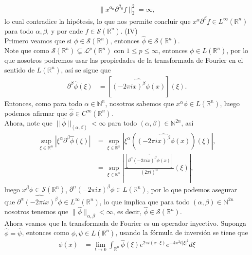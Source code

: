\begin{homeworkProblem}
\begin{solution}
    \begin{align*}
      \|x^{\alpha_0} \partial^{\beta_0} f\|_2^2 = \infty,
    \end{align*}
    lo cual contradice la hipótesis, lo que nos permite concluir que $x^\alpha \partial^\beta f \in L^\infty(\mathbb{R}^n)$ para todo $\alpha, \beta$, y por ende $f \in \mathcal{S}(\mathbb{R}^n)$.
    (IV)\\
    Primero veamos que si $\phi\in\mathcal{S}(\mathbb{R}^n)$, entonces $\hat{\phi}\in\mathcal{S}(\mathbb{R}^n)$.\\
	    Note que como $\mathcal{S}(\mathbb{R}^n)\subsetneq \mathcal{L}^p(\mathbb{R}^n)$ con $1\leq p \leq \infty$, entonces $\phi\in L(\mathbb{R}^n)$, por lo que nosotros podremos usar las propiedades de la transformada de Fourier en el sentido de $L(\mathbb{R}^n)$, así se sigue que
	    \begin{align*}
	      \partial^{\beta}\hat{\phi}(\xi)&=[\hat{(-2\pi i x)^{\beta}\phi(x)}](\xi).
	    \end{align*}
      Entonces, como para todo $\alpha\in\mathbb{N}^{n}$, nosotros sabemos que $x^\alpha \phi \in L(\mathbb{R}^n)$, luego podemos afirmar que $\hat{\phi}\in C^{\infty}(\mathbb{R}^{n})$.\\
	    Ahora, note que $\|\hat{\phi}\|_{(\alpha,\beta)}<\infty$ para todo $(\alpha,\beta)\in\mathbb{N}^{2n}$, así
	    \begin{align*}
        \sup_{\xi\in\mathbb{R}^n}|\xi^{\alpha}\partial^{\beta}\hat{\phi}(\xi)|&= \sup_{\xi\in\mathbb{R}^n}|\xi^{\alpha}(\hat{(-2\pi i x)^{\beta}\phi(x)})(\xi)|,\\
        &= \sup_{\xi\in\mathbb{R}^n}\left|\frac{[\hat{\partial^{\alpha}(-2\pi i x)^{\beta}\phi(x)}]}{(2\pi i)^{\alpha}}(\xi)\right|,
	    \end{align*}
      luego $x^{\beta}\phi\in\mathcal{S}(\mathbb{R}^n)$, $\partial^{\alpha}(-2\pi ix)^{\beta}\phi\in L(\mathbb{R}^n)$, por lo que podemos asegurar que $\hat{\partial^{\alpha}(-2\pi ix)^{\beta}\phi}\in L^{\infty}(\mathbb{R}^n)$, lo que implica que para todo $(\alpha,\beta)\in\mathbb{N}^{2n}$ nosotros tenemos que $\|\hat{\phi}\|_{\alpha,\beta}<\infty$, es decir, $\hat{\phi}\in\mathcal{S}(\mathbb{R}^{n})$.\\
      Ahora veamos que la transformada de Fourier es un operador inyectivo.
      Suponga $\hat{\phi}=\hat{\psi}$, entonces como $\phi,\psi\in L(\mathbb{R}^n)$, usando la fórmula de inversión se tiene que
		  \begin{align*}
			  \phi(x)&=\lim_{t\rightarrow 0}\int_{\mathbb{R}^n}\hat{\phi}(\xi)e^{2\pi i (x\cdot \xi)}e^{-4\pi^2t|\xi|^2}d\xi\\

\end{align*}
\end{solution}
\end{homeworkProblem}
